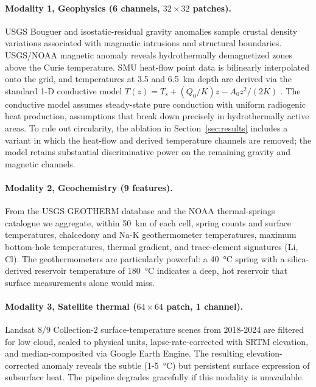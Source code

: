 \documentclass[review,12pt]{elsarticle}
\begin{document}
\paragraph{Modality 1, Geophysics (6 channels, $32\times32$ patches).} USGS Bouguer and isostatic-residual gravity anomalies sample crustal density variations associated with magmatic intrusions and structural boundaries. USGS/NOAA magnetic anomaly reveals hydrothermally demagnetized zones above the Curie temperature. SMU heat-flow point data \citep{Blackwell2011} is bilinearly interpolated onto the grid, and temperatures at 3.5 and \SI{6.5}{\kilo\meter} depth are derived via the standard 1-D conductive model $T(z) = T_s + (Q_0/K)z - A_0z^2/(2K)$ \citep{BlackwellRichards2004}. The conductive model assumes steady-state pure conduction with uniform radiogenic heat production, assumptions that break down precisely in hydrothermally active areas. To rule out circularity, the ablation in Section~\ref{sec:results} includes a variant in which the heat-flow and derived temperature channels are removed; the model retains substantial discriminative power on the remaining gravity and magnetic channels.

\paragraph{Modality 2, Geochemistry (9 features).} From the USGS GEOTHERM database and the NOAA thermal-springs catalogue we aggregate, within \SI{50}{\kilo\meter} of each cell, spring counts and surface temperatures, chalcedony \citep{Fournier1977} and Na-K \citep{Giggenbach1988} geothermometer temperatures, maximum bottom-hole temperatures, thermal gradient, and trace-element signatures (Li, Cl). The geothermometers are particularly powerful: a \SI{40}{\degreeCelsius} spring with a silica-derived reservoir temperature of \SI{180}{\degreeCelsius} indicates a deep, hot reservoir that surface measurements alone would miss.

\paragraph{Modality 3, Satellite thermal ($64\times64$ patch, 1 channel).} Landsat 8/9 Collection-2 surface-temperature scenes from 2018-2024 are filtered for low cloud, scaled to physical units, lapse-rate-corrected with SRTM elevation, and median-composited via Google Earth Engine. The resulting elevation-corrected anomaly reveals the subtle (1-\SI{5}{\degreeCelsius}) but persistent surface expression of subsurface heat. The pipeline degrades gracefully if this modality is unavailable.
\end{document}
